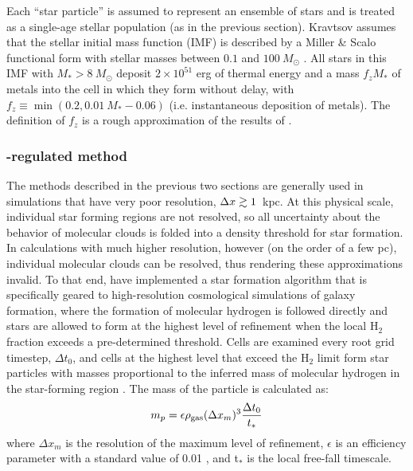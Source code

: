 Each ``star particle'' is assumed to represent an ensemble of stars
and is treated as a single-age stellar population (as in the previous
section).  Kravtsov assumes that the stellar initial mass function (IMF) is described by a Miller \&
Scalo functional form with stellar masses between $0.1$ and
$100~M_\odot$ \citep{1979ApJS...41..513M}.  All stars in this IMF with
$M_* > 8~M_\odot$ deposit $2 \times 10^{51}$ erg of thermal energy
and a mass $f_z M_*$ of metals into the cell in which they form
without delay, with $f_z \equiv \min(0.2, 0.01~M_*-0.06)$
(i.e. instantaneous deposition of metals).  The definition of $f_z$ is
a rough approximation of the results of \citet{1995ApJS..101..181W}.


\subsubsection{\HH-regulated method}
\label{sec:starform_H2reg}

The methods described in the previous two sections are generally used
in simulations that have very poor resolution, $\Delta x \gtrsim 1$~kpc.
At this physical scale, individual star forming regions are not
resolved, so all uncertainty about the behavior of molecular clouds is
folded into a density threshold for star formation.  In calculations
with much higher resolution, however (on the order of a few pc), individual
molecular clouds can be resolved, thus rendering these approximations
invalid.  To that end, \citet{2012ApJ...749...36K} have implemented
a star formation algorithm that is specifically geared to
high-resolution cosmological simulations of galaxy formation, where
the formation of molecular hydrogen is followed directly and stars
are allowed to form at the highest level of refinement when the local
H$_2$ fraction exceeds a pre-determined threshold.  Cells are examined
every root grid timestep, $\Delta t_0$, and cells at the highest level
that exceed the H$_2$ limit form star particles with masses
proportional to the inferred mass of molecular hydrogen in the
star-forming region
\citep{2008ApJ...689..865K,2009ApJ...693..216K,2010ApJ...709..308M}.
The mass of the particle is calculated as:
\begin{equation} 
m_p = \epsilon \rho_{\rm gas} (\Delta x_{m})^3 \frac{\Delta t_0}{t_*}
\end{equation}
where $\Delta x_{m}$ is the resolution of the maximum level of
refinement, $\epsilon$ is an efficiency parameter with a standard
value of 0.01 \citep[as motivated by][]{2007ApJ...654..304K}, and
t$_*$ is the local free-fall timescale.

